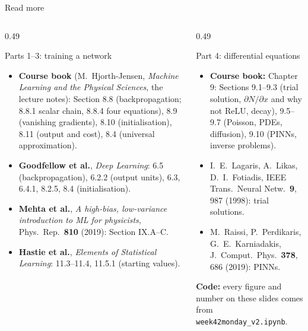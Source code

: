 \documentclass[10pt,aspectratio=169]{beamer}
\begin{document}
\begin{frame}{Read more}
\footnotesize
\begin{columns}[T]
\begin{column}{0.49\textwidth}
\begin{block}{Parts 1--3: training a network}
\footnotesize
\begin{itemize}
  \item \textbf{Course book} (M.~Hjorth-Jensen, \emph{Machine Learning
        and the Physical Sciences}, the lecture notes): Section 8.8
        (backpropagation; 8.8.1 scalar chain, 8.8.4 four equations), 8.9
        (vanishing gradients), 8.10 (initialisation), 8.11 (output and
        cost), 8.4 (universal approximation).
  \item \textbf{Goodfellow et al.}, \emph{Deep Learning}: 6.5
        (backpropagation), 6.2.2 (output units), 6.3, 6.4.1, 8.2.5, 8.4
        (initialisation).
  \item \textbf{Mehta et al.}, \emph{A high-bias, low-variance
        introduction to ML for physicists}, Phys.\ Rep.\ \textbf{810}
        (2019): Section IX.A--C.
  \item \textbf{Hastie et al.}, \emph{Elements of Statistical Learning}:
        11.3--11.4, 11.5.1 (starting values).
\end{itemize}
\end{block}
\end{column}
\begin{column}{0.49\textwidth}
\begin{block}{Part 4: differential equations}
\footnotesize
\begin{itemize}
  \item \textbf{Course book:} Chapter 9: Sections 9.1--9.3 (trial
        solution, $\partial N/\partial x$ and why not ReLU, decay),
        9.5--9.7 (Poisson, PDEs, diffusion), 9.10 (PINNs, inverse
        problems).
  \item I.~E.~Lagaris, A.~Likas, D.~I.~Fotiadis, IEEE Trans.\ Neural
        Netw.\ \textbf{9}, 987 (1998): trial solutions.
  \item M.~Raissi, P.~Perdikaris, G.~E.~Karniadakis, J.\ Comput.\ Phys.\
        \textbf{378}, 686 (2019): PINNs.
\end{itemize}
\end{block}
\textbf{Code:} every figure and number on these slides comes from
\texttt{week42monday\_v2.ipynb}.
\end{column}
\end{columns}
\end{frame}
\end{document}

